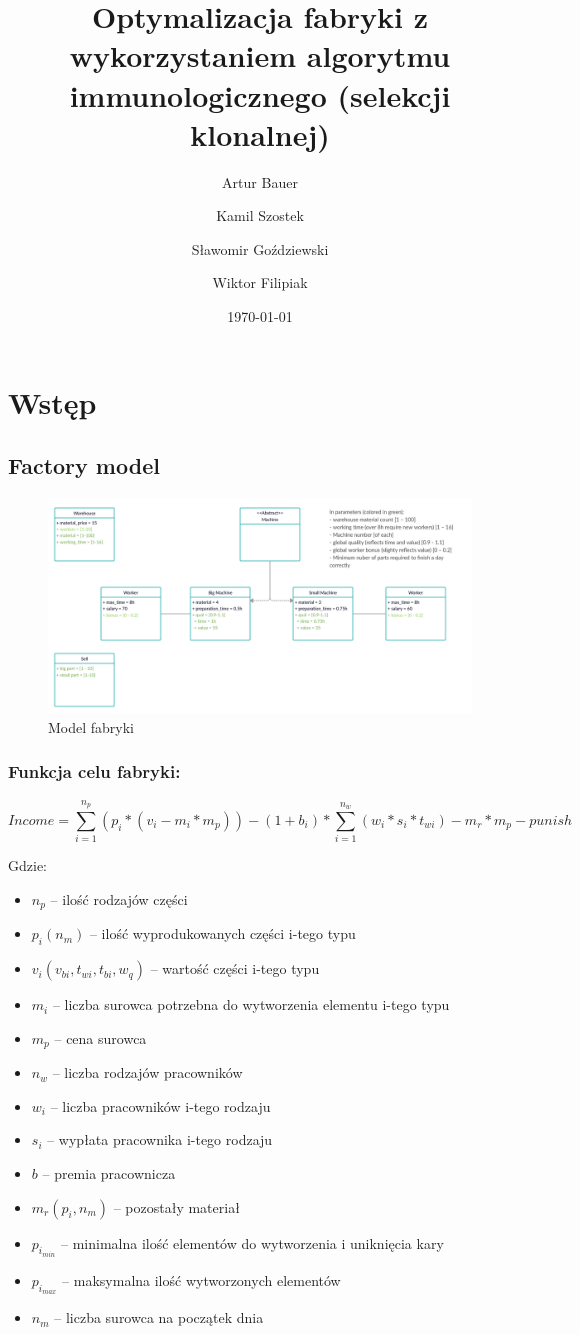 \documentclass[a4paper]{article}
\title{Optymalizacja fabryki z wykorzystaniem algorytmu immunologicznego (selekcji klonalnej)}
\author{Artur Bauer \and Kamil Szostek \and Sławomir Goździewski \and Wiktor Filipiak}
\date{\today}
\begin{document}


\tableofcontents

\newpage
\section{Wstęp}
\subsection{Factory model}\label{factory}

\begin{figure}[ht]
\centering
\includegraphics[width=.7\textwidth]{Factory_scheme.png}
\caption{Model fabryki}
\end{figure}

\subsubsection{Funkcja celu fabryki:}

$$Income = \sum^{n_p}_{i=1}(p_i*(v_i-m_i*m_p)) - (1+b_i)*\sum^{n_w}_{i = 1}(w_i*s_i *t_{wi}) - m_r*m_p - punish$$

Gdzie:
\begin{itemize}
    \item $n_p$ -- ilość rodzajów części
    \item $p_i (n_m)$ -- ilość wyprodukowanych części i-tego typu
    \item $v_i(v_{bi}, t_{wi},t_{bi},w_q)$ -- wartość części i-tego typu
    \item $m_i$ -- liczba surowca potrzebna do wytworzenia elementu i-tego typu
    \item $m_p$ -- cena surowca
    \item $n_w$ -- liczba rodzajów pracowników
    \item $w_i$ -- liczba pracowników i-tego rodzaju
    \item $s_i$ -- wypłata pracownika i-tego rodzaju
    \item $b$ -- premia pracownicza
    \item $m_r(p_i,n_m)$ -- pozostały materiał
    \item $p_{i_{min}}$ -- minimalna ilość elementów do wytworzenia i uniknięcia kary
    \item $p_{i_{max}}$ -- maksymalna ilość wytworzonych elementów
    \item $n_m$ -- liczba surowca na początek dnia
\end{itemize}
\end{document}

